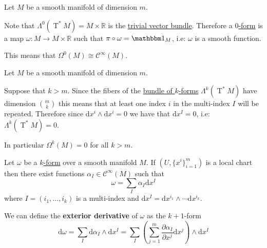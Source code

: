 \documentclass[../../main]{subfiles}
\begin{document}
\begin{example}
  Let \(M\) be a smooth manifold of dimension \(m\).

  Note that \(\Lambda^{0}(\operatorname{T}^{\ast}M) = M \times \mathbb{R}\) is the \hyperref[ex:trivial-topological-vector-bundle]{trivial vector bundle}.
  Therefore a \hyperref[def:smooth-k-form]{\(0\)-form} is a map \(\omega: M \to M \times \mathbb{R}\) such that \(\pi \circ \omega = \id_{M}\), i.e: \(\omega\) is a smooth function.

  This means that \(\Omega^{0}(M) \cong \mathcal{C}^{\infty}(M)\).
\end{example}

\begin{example}
  Let \(M\) be a smooth manifold of dimension \(m\).

  Suppose that \(k > m\).
  Since the fibers of the \hyperref[def:smooth-k-form-bundle]{bundle of \(k\)-forms} \(\Lambda^{k}(\operatorname{T}^{\ast}M)\) have dimension \({m \choose k}\) this means that at least one index \(i\) in the multi-index \(I\) will be repeated.
  Therefore since \(\mathrm{d}x^{i} \wedge \mathrm{d}x^{i} = 0\) we have that \(\mathrm{d}x^{I} = 0\), i.e: \(\Lambda^{k}(\operatorname{T}^{\ast}M) = 0\).

  In particular \(\Omega^{k}(M) = 0\) for all \(k > m\).
\end{example}



\begin{definition} \label{def:exterior-derivative-k-form}
  Let \(\omega\) be a \hyperref[def:smooth-k-form]{\(k\)-form} over a smooth manifold \(M\).
  If \((U, \{x^{i}\}_{i=1}^{m})\) is a local chart then there exist functions \(\alpha_{I} \in \mathcal{C}^{\infty}(M)\) such that
  \begin{equation*}
    \omega = \sum_{I} \alpha_{I} \mathrm{d}x^{I}
  \end{equation*}
  where \(I = (i_{1}, \ldots, i_{k})\) is a multi-index and \(\mathrm{d}x^{I} = \mathrm{d}x^{i_{1}} \wedge \cdots \mathrm{d}x^{i_{k}}\).

  We can define the \textbf{exterior derivative} of \(\omega\) as the \(k+1\)-form
  \begin{equation*}
    \mathrm{d}\omega = \sum_{I} \mathrm{d}\alpha_{I} \wedge \mathrm{d}x^{I} = \sum_{I} \left( \sum_{j=1}^{m} \frac{\partial \alpha_{I}}{\partial x^{j}} \mathrm{d}x^{j} \right) \wedge \mathrm{d}x^{I}
  \end{equation*}
\end{definition}
\end{document}
